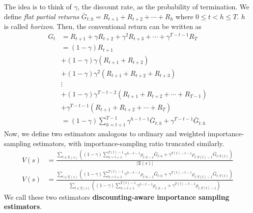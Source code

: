 \documentclass[../../main.tex]{subfiles}
\begin{document}
        The idea is to think of $\gamma$, the discount rate, as the probability of termination.
        We define \emph{flat partial returns} $\bar{G}_{t:h} = R_{t+1} + R_{t+2} + \cdots + R_h$ where $0 \leq t < h \leq T$. $h$ is called \emph{horizon}.
        Then, the conventional return can be written as
        \begin{align}
            G_t &= R_{t+1} + \gamma R_{t+2} + \gamma^2 R_{t+3} + \cdots + \gamma^{T-t-1}R_T \\
            &= (1-\gamma)R_{t+1} \\
            &+ (1-\gamma)\gamma(R_{t+1}+R_{t+2}) \\
            &+ (1-\gamma)\gamma^2(R_{t+1}+R_{t+2}+R_{t+3}) \\
            &\vdots \\
            &+ (1-\gamma)\gamma^{T-t-2}(R_{t+1}+R_{t+2}+\cdots+R_{T-1}) \\
            &+ \gamma^{T-t-1}(R_{t+1}+R_{t+2}+\cdots+R_T) \\
            &= (1-\gamma)\sum_{h=t+1}^{T-1}\gamma^{h-t-1}\bar{G}_{t:h} + \gamma^{T-t-1}\bar{G}_{t:h}
        \end{align}
        Now, we define two estimators analogous to ordinary and weighted importance-sampling estimators, with importance-sampling ratio
        truncated similarly.
        \begin{align}
            V(s) &= \frac{\sum_{t \in \mathfrak{T}(s)}\left((1-\gamma)\sum_{h=t+1}^{T(t)-1}\gamma^{h-t-1}\rho_{t:h-1}\bar{G}_{t:h} + \gamma^{T(t)-t-1}\rho_{t:T(t)-1}\bar{G}_{t:T(t)}\right)}{|\mathfrak{T}(s)|}
            \\
            V(s) &=
            \frac
            {\sum_{t \in \mathfrak{T}(s)}\left((1-\gamma)\sum_{h=t+1}^{T(t)-1}\gamma^{h-t-1}\rho_{t:h-1}\bar{G}_{t:h} + \gamma^{T(t)-t-1}\rho_{t:T(t)-1}\bar{G}_{t:T(t)}\right)}
            {\sum_{t \in \mathfrak{T}(s)}\left((1-\gamma)\sum_{h=t+1}^{T(t)-1}\gamma^{h-t-1}\rho_{t:h-1} + \gamma^{T(t)-t-1}\rho_{t:T(t)-1}\right)}
        \end{align}
        We call these two estimators \textbf{discounting-aware importance sampling estimators}.
    
\end{document}
